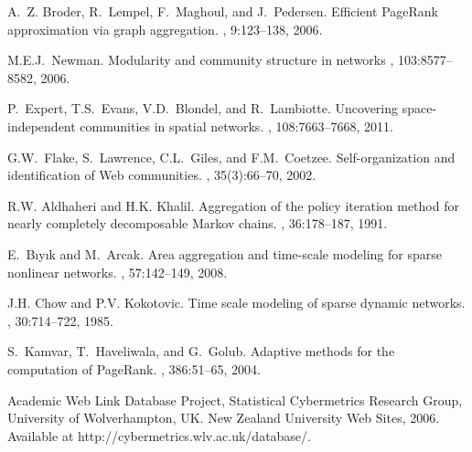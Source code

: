 \documentclass[11pt,draftcls,onecolumn]{IEEEtran}
\begin{document}
\begin{table}[t]
\begin{thebibliography}{1}
A.~Z. Broder, R.~Lempel, F.~Maghoul, and J.~Pedersen.
\newblock Efficient {P}age{R}ank approximation via graph aggregation.
, 9:123--138, 2006.

M.{\;}E.{\;}J.~Newman.
\newblock Modularity and community structure in networks
, 
103:8577--8582, 2006.

P.~Expert, T.\;S.~Evans, V.{\;}D.~Blondel, and R.\ Lambiotte.
\newblock Uncovering space-independent communities in spatial networks.
, 
108:7663--7668, 2011.

G.\;W.~Flake, S.~Lawrence, C.\;L.~Giles, and F.\;M.\ Coetzee.
\newblock Self-organization and identification of Web communities.
, 35(3):66--70, 2002.



R.{\;}W. Aldhaheri and H.{\;}K. Khalil.
\newblock Aggregation of the policy iteration method for nearly completely
  decomposable {M}arkov chains.
, 36:178--187, 1991.

E.~B{\i}y{\i}k and M.~Arcak.
\newblock Area aggregation and time-scale modeling for sparse nonlinear
  networks.
, 57:142--149, 2008.

J.{\;}H. Chow and P.{\;}V. Kokotovic.
\newblock Time scale modeling of sparse dynamic networks.
, 30:714--722, 1985.


S.~Kamvar, T.~Haveliwala, and G.~Golub.
\newblock Adaptive methods for the computation of {P}age{R}ank.
, 386:51--65, 2004.

Academic Web Link Database Project, 
Statistical Cybermetrics Research Group,
University of Wolverhampton, UK.
New Zealand University Web Sites, 2006.
\newblock 
Available at http://cybermetrics.wlv.ac.uk/database/.



\end{thebibliography}
\end{table}
\end{document}

